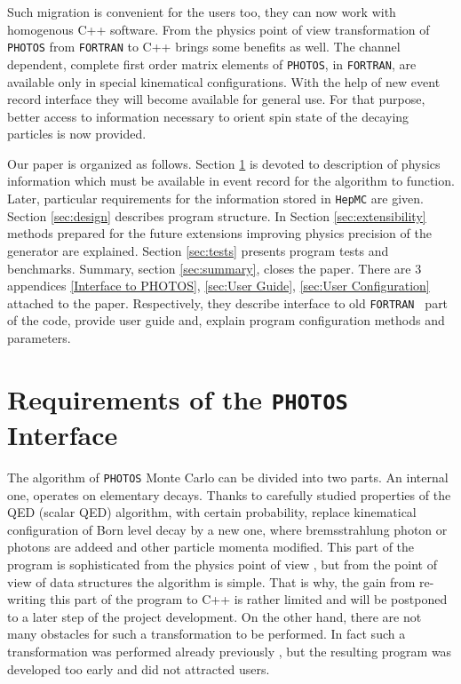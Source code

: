 \documentclass[]{Photos_interface_design}
\begin{document}
Such migration is convenient for the users too,  they can now work
with  homogenous C++ software. From the physics point of view transformation 
of {\tt PHOTOS} 
from {\tt FORTRAN} to C++  brings some benefits as well.
The channel dependent, complete first order matrix elements of {\tt PHOTOS}, in {\tt FORTRAN},
 are available only 
in special
kinematical configurations. With the help of new event record interface they will become
available for general use.
For that purpose, better access to information necessary to orient spin state of the decaying particles
is now provided.



Our paper is organized as follows. Section \ref{sec:requrements} is devoted
to description of physics information which must be available in event
record for the algorithm to function. Later, particular requirements for the 
information stored in {\tt HepMC} are given. Section \ref{sec:design} describes
program structure. In Section  \ref{sec:extensibility} methods prepared for the
future extensions improving physics precision of the generator are explained.
Section \ref{sec:tests} presents program tests and benchmarks. 
Summary, section \ref{sec:summary}, closes the paper.
There are 3 appendices \ref{Interface to PHOTOS}, 
\ref{sec:User Guide}, \ref{sec:User Configuration} attached to the paper.
Respectively, they describe interface to old {\tt FORTRAN } part of the code,
provide user guide and, explain program configuration methods and parameters. 


\section{Requirements of the {\tt PHOTOS} Interface}
\label{sec:requrements}
The algorithm of {\tt PHOTOS} Monte Carlo can be divided into two parts.
An internal one, operates on elementary decays. Thanks to carefully 
studied properties of the 
QED (scalar QED) algorithm, with certain probability, 
replace  kinematical configuration of Born level decay by a new one, 
where bremsstrahlung photon or photons
are addeed and other particle momenta modified. This part of the program is sophisticated from the physics 
point of view \cite{Nanava:2006vv,Golonka:2006tw},
but from the point of view of data structures the algorithm is simple.
That is why, the gain from re-writing this part of the program to C++ is rather
limited and will be postponed to a later step of the project development.
On the other hand, there are not many obstacles for such a transformation to be
performed. In fact such a transformation was performed already
previously \cite{photosplus}, but the resulting program was developed too early 
and did not attracted users.
\end{document}
